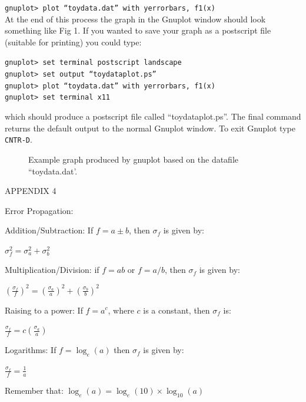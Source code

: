 \documentclass[12pt]{article}
\begin{document}
{\tt gnuplot> plot ``toydata.dat'' with yerrorbars, f1(x)}\\
\newpage
At the end of this process the graph in the Gnuplot window should look
something like Fig 1. If you wanted to save your graph as a postscript
file (suitable for printing) you could type:

{\tt gnuplot> set terminal postscript landscape}\\
{\tt gnuplot> set output ``toydataplot.ps''}\\
{\tt gnuplot> plot ``toydata.dat'' with yerrorbars, f1(x)}\\
{\tt gnuplot> set terminal x11}

which should produce a postscript file called ``toydataplot.ps''. The
final command returns the default output to the normal Gnuplot
window. To exit Gnuplot type {\tt CNTR-D}.

\begin{figure}
\centerline{}
\caption{Example graph produced 
by gnuplot based on the datafile ``toydata.dat'.}
\end{figure}

\newpage

\centerline{\Huge APPENDIX 4}

\Large{Error Propagation:}\\

\bigskip

\noindent
Addition/Subtraction: If $f=a\pm b$, then $\sigma_f$ is given by:
\begin{center}
\Large {$\sigma^2_{f} = \sigma_a^2 + \sigma_b^2$}
\end{center}

\bigskip

Multiplication/Division: if $f=ab$ or $f=a/b$, then $\sigma_f$ is
given by:
\begin{center}
\Large{$\left(\frac{\sigma_f}{f}\right)^2 = \left(\frac{\sigma_a}{a}\right)^2 + \left(\frac{\sigma_b}{b}\right)^2$}
\end{center}

\bigskip

Raising to a power: If $f=a^c$, where $c$ is a constant, then
$\sigma_f$ is:
\begin{center}
\Large{$\frac{\sigma_f}{f}=c\left(\frac{\sigma_a}{a}\right)$}
\end{center}

\bigskip

Logarithms: If $f=\log_{e}(a)$ then $\sigma_f$ is given by:
\begin{center}
\Large{$\frac{\sigma_f}{f}=\frac{1}{a}$}
\end{center}
Remember that: $\log_{e}(a)=\log_{e}(10)\times \log_{10}(a)$
\end{document}
